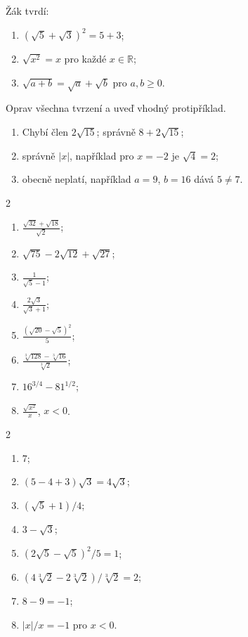 \documentclass[11pt,a4paper]{article}
\begin{document}
\begin{zadaniReseniBox}[breakable=false,title={Rozšiřující příklad 2: co je špatně?}]
Žák tvrdí:
\begin{enumerate}[label=\alph*)]
\item $(\sqrt5+\sqrt3)^2=5+3$;
\item $\sqrt{x^2}=x$ pro každé $x\in\mathbb R$;
\item $\sqrt{a+b}=\sqrt a+\sqrt b$ pro $a,b\ge0$.
\end{enumerate}
Oprav všechna tvrzení a uveď vhodný protipříklad.
\tcblower
\begin{enumerate}[label=\alph*)]
\item Chybí člen $2\sqrt{15}$; správně $8+2\sqrt{15}$;
\item správně $|x|$, například pro $x=-2$ je $\sqrt4=2$;
\item obecně neplatí, například $a=9$, $b=16$ dává $5\ne7$.
\end{enumerate}
\end{zadaniReseniBox}

\begin{zadaniReseniBox}[breakable=false,title={Domácí úkol 1: směs probraných operací}]
\begin{multicols}{2}
\begin{enumerate}[label=\alph*)]
\item $\displaystyle\frac{\sqrt{32}+\sqrt{18}}{\sqrt2}$;
\item $\sqrt{75}-2\sqrt{12}+\sqrt{27}$;
\item $\displaystyle\frac1{\sqrt5-1}$;
\item $\displaystyle\frac{2\sqrt3}{\sqrt3+1}$;
\item $\displaystyle\frac{(\sqrt{20}-\sqrt5)^2}{5}$;
\item $\displaystyle\frac{\sqrt[3]{128}-\sqrt[3]{16}}{\sqrt[3]2}$;
\item $16^{3/4}-81^{1/2}$;
\item $\displaystyle\frac{\sqrt{x^2}}x$, $x<0$.
\end{enumerate}
\end{multicols}
\tcblower
\begin{multicols}{2}
\begin{enumerate}[label=\alph*)]
\item $\boxed7$;
\item $(5-4+3)\sqrt3=\boxed{4\sqrt3}$;
\item $\boxed{(\sqrt5+1)/4}$;
\item $\boxed{3-\sqrt3}$;
\item $(2\sqrt5-\sqrt5)^2/5=\boxed1$;
\item $(4\sqrt[3]2-2\sqrt[3]2)/\sqrt[3]2=\boxed2$;
\item $8-9=\boxed{-1}$;
\item $|x|/x=\boxed{-1}$ pro $x<0$.
\end{enumerate}
\end{multicols}
\end{zadaniReseniBox}

\end{document}
